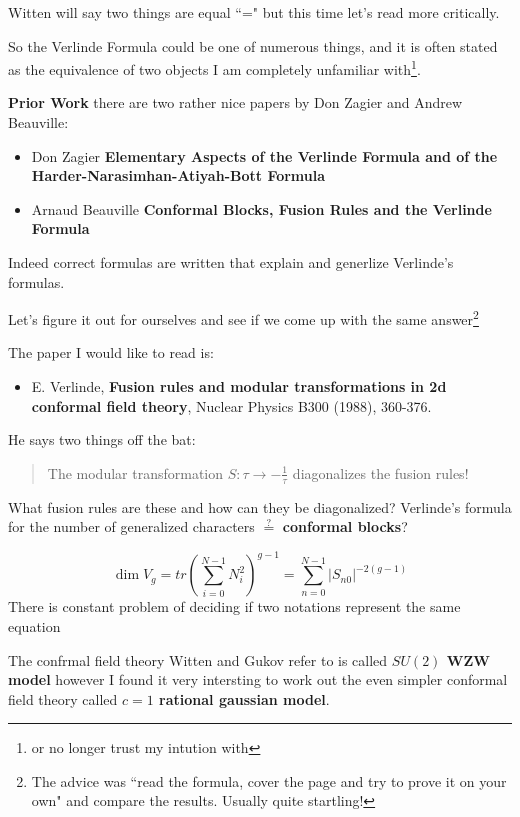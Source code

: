 \documentclass[12pt]{article}
\begin{document}
\noindent Witten will say two things are equal ``=" but this time let's read more critically. \newline

\noindent So the Verlinde Formula could be one of numerous things, and it is often stated as the equivalence of two objects I am completely unfamiliar with\footnote{or no longer trust my intution with}. \newpage

\noindent \textbf{Prior Work} there are two rather nice papers by Don Zagier and 
Andrew Beauville:

\begin{itemize}
\item Don Zagier \textbf{Elementary Aspects of the
Verlinde Formula and of the
Harder-Narasimhan-Atiyah-Bott
Formula}
\item Arnaud Beauville \textbf{Conformal Blocks, Fusion Rules and the Verlinde Formula}
\end{itemize}
Indeed correct formulas are written that explain and generlize Verlinde's formulas.  \newline

\noindent Let's figure it out for ourselves and see if we come up with the same answer\footnote{The advice was ``read the formula, cover the page and try to prove it on your own" and compare the results.  Usually quite startling!}
\newpage

\noindent The paper I would like to read is:
\begin{itemize}
\item  E. Verlinde, \textbf{Fusion rules and modular transformations in 2d conformal field theory},
Nuclear Physics B300 (1988), 360-376.
\end{itemize}

\noindent He says two things off the bat:
\begin{quotation}
\noindent The modular transformation $S: \tau \to - \frac{1}{\tau}$ diagonalizes the fusion rules!
\end{quotation}
What fusion rules are these and how can they be diagonalized?  Verlinde's formula for the number of {\color{blue} generalized characters} $\stackrel{?}{=}$ \textbf{conformal blocks}?

$$ \dim V_g = tr \left( \sum_{i=0}^{N-1} N_i^2 \right)^{g-1} = \sum_{n = 0}^{N-1} |S_{n0}|^{-2(g-1)}$$
There is constant problem of deciding if two notations represent the same equation

\newpage

\noindent The confrmal field theory Witten and Gukov refer to is called \textbf{$SU(2)$ WZW model} however I found it very intersting to work out the even simpler conformal field theory called \textbf{$c=1$ rational gaussian model}. \newline
\end{document}
